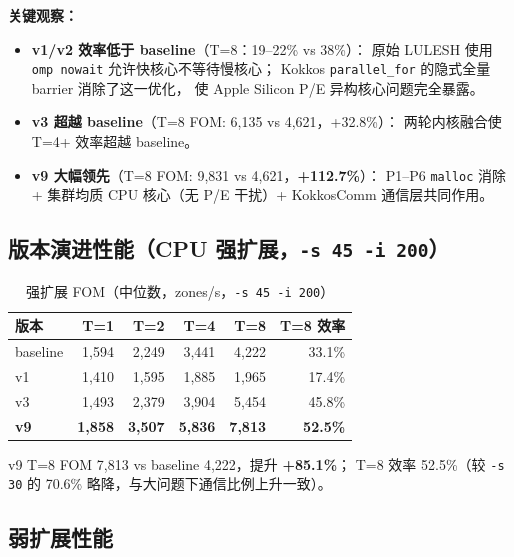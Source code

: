 \documentclass[UTF8,12pt,a4paper]{ctexart}
\begin{document}
\textbf{关键观察：}
\begin{itemize}[noitemsep,topsep=2pt]
  \item \textbf{v1/v2 效率低于 baseline}（T=8：19--22\% vs 38\%）：
        原始 LULESH 使用 \texttt{omp nowait} 允许快核心不等待慢核心；
        Kokkos \texttt{parallel\_for} 的隐式全量 barrier 消除了这一优化，
        使 Apple Silicon P/E 异构核心问题完全暴露。
  \item \textbf{v3 超越 baseline}（T=8 FOM: 6,135 vs 4,621，+32.8\%）：
        两轮内核融合使 T=4+ 效率超越 baseline。
  \item \textbf{v9 大幅领先}（T=8 FOM: 9,831 vs 4,621，\textbf{+112.7\%}）：
        P1--P6 \texttt{malloc} 消除 + 集群均质 CPU 核心（无 P/E 干扰）+
        KokkosComm 通信层共同作用。
\end{itemize}

\subsection{版本演进性能（CPU 强扩展，\texttt{-s 45 -i 200}）}

\begin{table}[H]
\centering
\caption{强扩展 FOM（中位数，zones/s，\texttt{-s 45 -i 200}）}
\label{tab:strong45}
\begin{tabular}{lrrrrr}
\toprule
\textbf{版本} & \textbf{T=1} & \textbf{T=2} & \textbf{T=4} & \textbf{T=8} & \textbf{T=8 效率} \\
\midrule
baseline    & 1,594 & 2,249 & 3,441 & 4,222 & 33.1\% \\
v1          & 1,410 & 1,595 & 1,885 & 1,965 & 17.4\% \\
v3          & 1,493 & 2,379 & 3,904 & 5,454 & 45.8\% \\
\textbf{v9} & \textbf{1,858} & \textbf{3,507} & \textbf{5,836} & \textbf{7,813} & \textbf{52.5\%} \\
\bottomrule
\end{tabular}
\end{table}

v9 T=8 FOM 7,813 vs baseline 4,222，提升 \textbf{+85.1\%}；
T=8 效率 52.5\%（较 \texttt{-s 30} 的 70.6\% 略降，与大问题下通信比例上升一致）。

\subsection{弱扩展性能}
\end{document}
